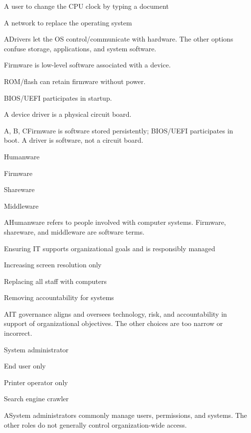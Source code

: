 \begin{enumerate}[label=\textbf{Q\arabic*.}, leftmargin=*]
{   \item A user to change the CPU clock by typing a document
   \item A network to replace the operating system}
  {A}{Drivers let the OS control/communicate with hardware. The other options confuse storage, applications, and system software.}
  {\item Firmware is low-level software associated with a device.
   \item ROM/flash can retain firmware without power.
   \item BIOS/UEFI participates in startup.
   \item A device driver is a physical circuit board.}
  {A, B, C}{Firmware is software stored persistently; BIOS/UEFI participates in boot. A driver is software, not a circuit board.}
\fi
\ifnum{}
  {\item Humanware
   \item Firmware
   \item Shareware
   \item Middleware}
  {A}{Humanware refers to people involved with computer systems. Firmware, shareware, and middleware are software terms.}
  {\item Ensuring IT supports organizational goals and is responsibly managed
   \item Increasing screen resolution only
   \item Replacing all staff with computers
   \item Removing accountability for systems}
  {A}{IT governance aligns and oversees technology, risk, and accountability in support of organizational objectives. The other choices are too narrow or incorrect.}
  {\item System administrator
   \item End user only
   \item Printer operator only
   \item Search engine crawler}
  {A}{System administrators commonly manage users, permissions, and systems. The other roles do not generally control organization-wide access.}

\end{enumerate}
